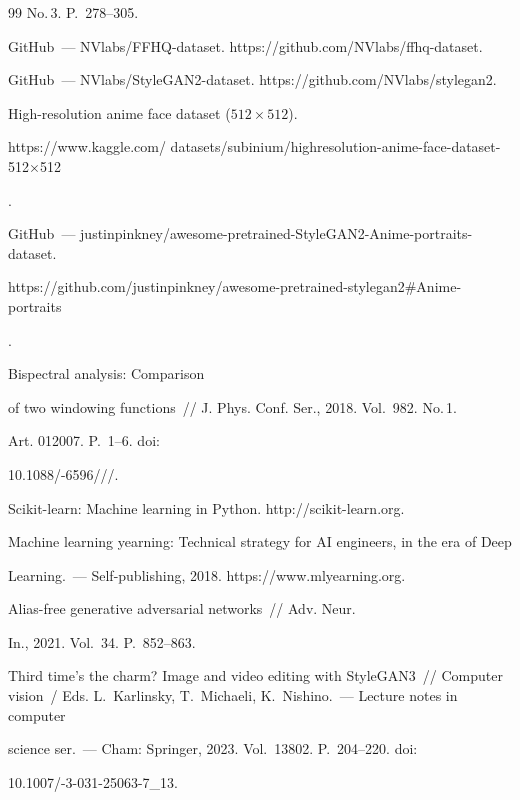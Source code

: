 {{\begin{thebibliography}{99}
No.\,3. P.~278--305.




  GitHub~--- NVlabs/FFHQ-dataset. {\sf https://github.com/NVlabs/ffhq-dataset}.




  GitHub~--- NVlabs/StyleGAN2-dataset. {\sf https://github.com/NVlabs/stylegan2}.




  High-resolution anime face dataset ($512\times512$). {\sf 


https://www.kaggle.com/ datasets/subinium/highresolution-anime-face-dataset-512$\times$512}.




  GitHub~--- justinpinkney/awesome-pretrained-StyleGAN2-Anime-portraits-dataset. {\sf 


https://github.com/justinpinkney/awesome-pretrained-stylegan2\#Anime-portraits}.




   Bispectral analysis: Comparison 


of two windowing functions~/\!\!/ J. Phys. Conf. Ser., 2018. Vol.~982. No.\,1. 


Art. 012007. P.~1--6.  doi:  


10.1088\!/-6596\!/\!/\!/.


  




  Scikit-learn: Machine learning in Python. {\sf http://scikit-learn.org}.




   Machine learning yearning: Technical strategy for AI engineers, in the era of Deep 


Learning.~--- Self-publishing, 2018. {\sf https://www.mlyearning.org}. 




   Alias-free generative adversarial networks~/\!\!/ Adv.  Neur. 


In., 2021. Vol.~34. P.~852--863.






Third time's the charm? Image and video editing with StyleGAN3~/\!\!/ Computer vision~/ Eds. L.~Karlinsky, T.~Michaeli, K.~Nishino.~--- Lecture notes in computer 


science ser.~--- Cham: Springer, 2023. Vol.~13802. P.~204--220. doi:  


10.1007\!/-3-031-25063-7\_13.


 \end{thebibliography}


} }











